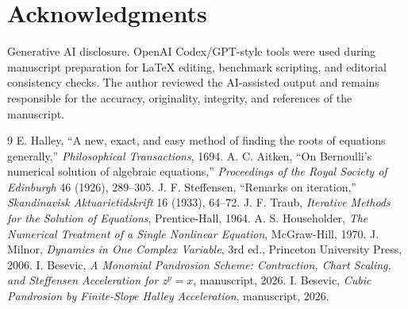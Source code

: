 \documentclass[11pt]{article}
\begin{document}
\section*{Acknowledgments}
Generative AI disclosure.  OpenAI Codex/GPT-style tools were used during manuscript preparation for LaTeX editing, benchmark scripting, and editorial consistency checks.  The author reviewed the AI-assisted output and remains responsible for the accuracy, originality, integrity, and references of the manuscript.

\begin{thebibliography}{9}
E. Halley, ``A new, exact, and easy method of finding the roots of equations generally,'' \emph{Philosophical Transactions}, 1694.
A. C. Aitken, ``On Bernoulli's numerical solution of algebraic equations,'' \emph{Proceedings of the Royal Society of Edinburgh} 46 (1926), 289--305.
J. F. Steffensen, ``Remarks on iteration,'' \emph{Skandinavisk Aktuarietidskrift} 16 (1933), 64--72.
J. F. Traub, \emph{Iterative Methods for the Solution of Equations}, Prentice-Hall, 1964.
A. S. Householder, \emph{The Numerical Treatment of a Single Nonlinear Equation}, McGraw-Hill, 1970.
J. Milnor, \emph{Dynamics in One Complex Variable}, 3rd ed., Princeton University Press, 2006.
I. Besevic, \emph{A Monomial Pandrosion Scheme: Contraction, Chart Scaling, and Steffensen Acceleration for $z^p=x$}, manuscript, 2026.
I. Besevic, \emph{Cubic Pandrosion by Finite-Slope Halley Acceleration}, manuscript, 2026.
\end{thebibliography}
\end{document}
